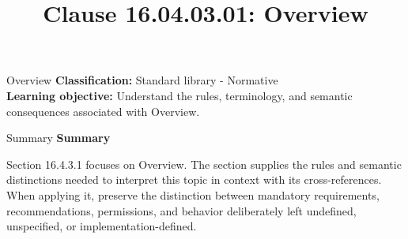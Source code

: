 \documentclass[10pt,letterpaper]{article}
\title{Clause 16.04.03.01: Overview}
\author{}
\date{}
\begin{document}
\maketitle
\begin{CornellOverviewBox}{Overview}
\textbf{Classification:} Standard library - Normative\\[2pt]
\textbf{Learning objective:} Understand the rules, terminology, and semantic consequences associated with Overview.
\end{CornellOverviewBox}\begin{CornellSummaryBox}{Summary}
{\sffamily\bfseries\color{Accent} Summary}\par\vspace{3pt}Section 16.4.3.1 focuses on Overview. The section supplies the rules and semantic distinctions needed to interpret this topic in context with its cross-references. When applying it, preserve the distinction between mandatory requirements, recommendations, permissions, and behavior deliberately left undefined, unspecified, or implementation-defined.
\end{CornellSummaryBox}
\end{document}

